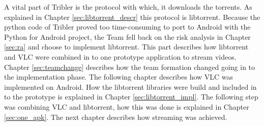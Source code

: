 A vital part of Tribler is the protocol with which, it downloads the torrents. As explained in Chapter \ref{sec:libtorrent_descr} this protocol is libtorrent. Because the python code of Tribler proved too time-consuming to port to Android with the Python for Android project, the Team fell back on the risk analysis in Chapter \ref{sec:ra} and choose to implement libtorrent. 
This part describes how libtorrent and VLC were combined in to one prototype application to stream videos. Chapter \ref{sec:teamchange} describes how the team formation changed going in to the implementation phase. The following chapter describes how VLC was implemented on Android. How the libtorrent libraries were build and included in to the prototype is explained in Chapter \ref{sec:libtorrent_impl}. The following step was combining VLC and libtorrent, how this was done is explained in Chapter \ref{sec:one_apk}. The next chapter describes how streaming was achieved.